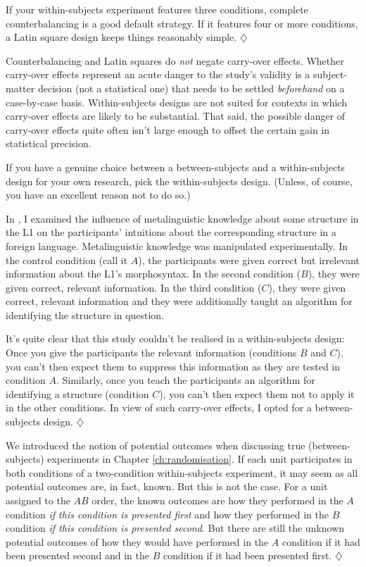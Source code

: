 \documentclass[a4paper]{tufte-book}\usepackage[]{graphicx}\usepackage[]{xcolor}
\newcommand*{\parend}[1][$\diamondsuit$]{%
  \unskip\nobreak\hspace{1em plus 1fill}$\diamondsuit$%
}
\begin{document}
  If your within-subjects experiment features three conditions,
  complete counterbalancing is a good default strategy.
  If it features four or more conditions,
  a Latin square design keeps things reasonably simple.
\parend

Counterbalancing and Latin squares do \emph{not} negate carry-over effects.
Whether carry-over effects represent an acute danger to the study's
validity is a subject-matter decision (not a statistical one)
that needs to be settled \emph{beforehand} on a case-by-case basis.
Within-subjects designs are not suited for contexts in which carry-over effects
are likely to be substantial.
That said, the possible danger of carry-over effects quite often isn't
large enough to offset the certain gain in statistical precision.

\begin{framed}
If you have a genuine choice between a between-subjects
and a within-subjects design for your own research, pick the 
within-subjects design. (Unless, of course, you have an excellent
reason not to do so.)
\end{framed}

  In \citet{Vanhove2018}, I examined the influence of metalinguistic knowledge
  about some structure in the L1 on the participants' intuitions about 
  the corresponding structure in a foreign language.
  Metalinguistic knowledge was manipulated experimentally.
  In the control condition (call it $A$), the participants were 
  given correct but irrelevant information about the L1's morphosyntax.
  In the second condition ($B$), they were given correct, relevant information.
  In the third condition ($C$), they were given correct, relevant information
  and they were additionally taught an algorithm for identifying the structure in question.
  
  It's quite clear that this study couldn't be realised in a within-subjects design:
  Once you give the participants the relevant information (conditions $B$ and $C$), 
  you can't then expect them to suppress this information as they are tested in condition $A$.
  Similarly, once you teach the participants an algorithm for identifying a structure (condition $C$),
  you can't then expect them not to apply it in the other conditions.
  In view of such carry-over effects,
  I opted for a between-subjects design.
\parend

  We introduced the notion of potential outcomes when discussing 
  true (between-subjects) experiments in Chapter \ref{ch:randomisation}.
  If each unit participates in both conditions of a two-condition within-subjects
  experiment, it may seem as all potential outcomes are, in fact, known.
  But this is not the case.
  For a unit assigned to the $AB$ order, the known outcomes are how they
  performed in the $A$ condition \emph{if this condition is presented first}
  and how they performed in the $B$ condition \emph{if this condition is presented second}.
  But there are still the unknown potential outcomes of how they would have performed
  in the $A$ condition if it had been presented second and in the $B$ condition
  if it had been presented first.
\parend
\end{document}
